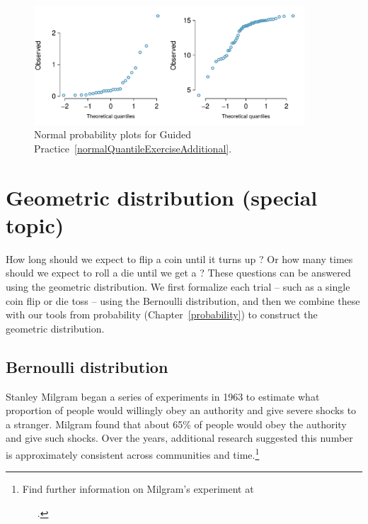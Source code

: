 \begin{figure}
\centering
\includegraphics[width=0.9\textwidth]{ch_distributions/figures/normalQuantileExer/normalQuantileExerAdditional}
\caption{Normal probability plots for Guided Practice~\ref{normalQuantileExerciseAdditional}.}
\label{normalQuantileExerAdditional}
\end{figure}




\section{Geometric distribution (special topic)}
\label{geomDist}

How long should we expect to flip a coin until it turns up ? Or how many times should we expect to roll a die until we get a ? These questions can be answered using the geometric distribution. We first formalize each trial -- such as a single coin flip or die toss -- using the Bernoulli distribution, and then we combine these with our tools from probability (Chapter~\ref{probability}) to construct the geometric distribution.

\subsection{Bernoulli distribution}
\label{bernoulli}


Stanley Milgram began a series of experiments in 1963 to estimate what proportion of people would willingly obey an authority and give severe shocks to a stranger. Milgram found that about 65\% of people would obey the authority and give such shocks. Over the years, additional research suggested this number is approximately consistent across communities and time.\footnote{Find further information on Milgram's experiment at \par \ \ \hspace{0.2mm}\ .}

